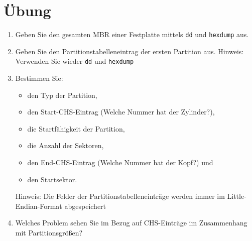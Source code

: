 \documentclass[11pt,a4paper]{article}
\def\inlinebash{\lstinline[style=bash]}
\begin{document}
\section{Übung}
\begin{enumerate}
	\item Geben Sie den gesamten MBR einer Festplatte mittels \inlinebash$dd$ und 
		\inlinebash$hexdump$ aus.
	\item Geben Sie den Partitionstabelleneintrag der ersten Partition aus. Hinweis:
		Verwenden Sie wieder \inlinebash$dd$ und \inlinebash$hexdump$
	\item Bestimmen Sie:
		\begin{itemize}
			\item den Typ der Partition,
			\item den Start-CHS-Eintrag (Welche Nummer hat der Zylinder?),
			\item die Startfähigkeit der Partition,
			\item die Anzahl der Sektoren,
			\item den End-CHS-Eintrag (Welche Nummer hat der Kopf?) und
			\item den Startsektor.
		\end{itemize}
		Hinweis: Die Felder der Partitionstabelleneinträge werden immer im 
			Little-Endian-Format abgespeichert

	\item Welches Problem sehen Sie im Bezug auf CHS-Einträge im Zusammenhang
		mit Partitionsgrößen?
\end{enumerate}
\end{document}
